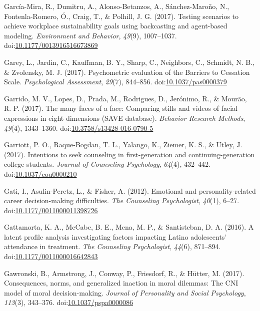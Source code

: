 \documentclass[english,man]{apa6}
\theoremstyle{definition}
\theoremstyle{definition}
\theoremstyle{definition}
\theoremstyle{remark}
\begin{document}
\hypertarget{ref-Garcia-Mira2017}{}
García-Mira, R., Dumitru, A., Alonso-Betanzos, A., Sánchez-Maroño, N.,
Fontenla-Romero, Ó., Craig, T., \& Polhill, J. G. (2017). Testing
scenarios to achieve workplace sustainability goals using backcasting
and agent-based modeling. \emph{Environment and Behavior}, \emph{49}(9),
1007--1037.
doi:\href{https://doi.org/10.1177/0013916516673869}{10.1177/0013916516673869}

\hypertarget{ref-Garey2017}{}
Garey, L., Jardin, C., Kauffman, B. Y., Sharp, C., Neighbors, C.,
Schmidt, N. B., \& Zvolensky, M. J. (2017). Psychometric evaluation of
the Barriers to Cessation Scale. \emph{Psychological Assessment},
\emph{29}(7), 844--856.
doi:\href{https://doi.org/10.1037/pas0000379}{10.1037/pas0000379}

\hypertarget{ref-Garrido2016}{}
Garrido, M. V., Lopes, D., Prada, M., Rodrigues, D., Jerónimo, R., \&
Mourão, R. P. (2017). The many faces of a face: Comparing stills and
videos of facial expressions in eight dimensions (SAVE database).
\emph{Behavior Research Methods}, \emph{49}(4), 1343--1360.
doi:\href{https://doi.org/10.3758/s13428-016-0790-5}{10.3758/s13428-016-0790-5}

\hypertarget{ref-Garriott2017}{}
Garriott, P. O., Raque-Bogdan, T. L., Yalango, K., Ziemer, K. S., \&
Utley, J. (2017). Intentions to seek counseling in first-generation and
continuing-generation college students. \emph{Journal of Counseling
Psychology}, \emph{64}(4), 432--442.
doi:\href{https://doi.org/10.1037/cou0000210}{10.1037/cou0000210}

\hypertarget{ref-Gati2012}{}
Gati, I., Asulin-Peretz, L., \& Fisher, A. (2012). Emotional and
personality-related career decision-making difficulties. \emph{The
Counseling Psychologist}, \emph{40}(1), 6--27.
doi:\href{https://doi.org/10.1177/0011000011398726}{10.1177/0011000011398726}

\hypertarget{ref-Gattamorta2016}{}
Gattamorta, K. A., McCabe, B. E., Mena, M. P., \& Santisteban, D. A.
(2016). A latent profile analysis investigating factors impacting Latino
adolescents' attendance in treatment. \emph{The Counseling
Psychologist}, \emph{44}(6), 871--894.
doi:\href{https://doi.org/10.1177/0011000016642843}{10.1177/0011000016642843}

\hypertarget{ref-Gawronski2017}{}
Gawronski, B., Armstrong, J., Conway, P., Friesdorf, R., \& Hütter, M.
(2017). Consequences, norms, and generalized inaction in moral dilemmas:
The CNI model of moral decision-making. \emph{Journal of Personality and
Social Psychology}, \emph{113}(3), 343--376.
doi:\href{https://doi.org/10.1037/pspa0000086}{10.1037/pspa0000086}
\end{document}
